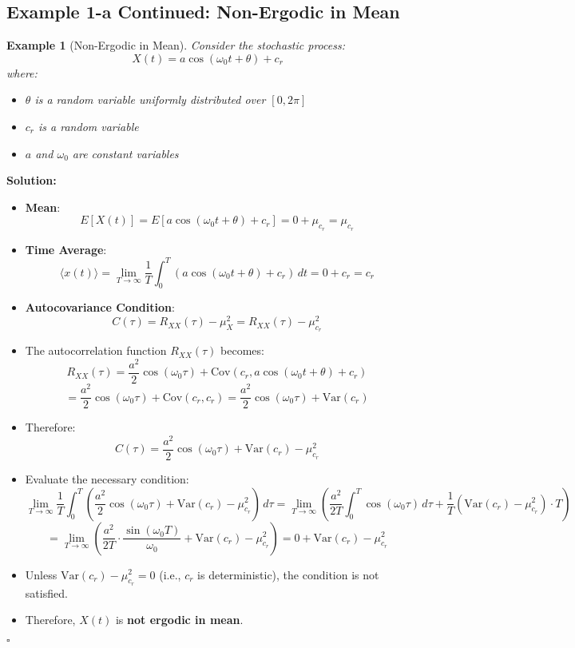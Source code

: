\documentclass[12pt]{article}
\newtheorem{example}{Example}
\newenvironment{solution}{\noindent\textbf{Solution:}}{\hfill$\square$}
\begin{document}
\subsection{Example 1-a Continued: Non-Ergodic in Mean}
\begin{example}[Non-Ergodic in Mean]
Consider the stochastic process:
\[
X(t) = a \cos(\omega_0 t + \theta) + c_r
\]
where:
\begin{itemize}
    \item \( \theta \) is a random variable uniformly distributed over \( [0, 2\pi] \)
    \item \( c_r \) is a random variable
    \item \( a \) and \( \omega_0 \) are constant variables
\end{itemize}
\end{example}
\begin{solution}
\begin{itemize}
    \item \textbf{Mean}:
    \[
    E[X(t)] = E[a \cos(\omega_0 t + \theta) + c_r] = 0 + \mu_{c_r} = \mu_{c_r}
    \]
    \item \textbf{Time Average}:
    \[
    \langle x(t) \rangle = \lim_{T \to \infty} \frac{1}{T} \int_{0}^{T} (a \cos(\omega_0 t + \theta) + c_r) \, dt = 0 + c_r = c_r
    \]
    \item \textbf{Autocovariance Condition}:
    \[
    C(\tau) = R_{XX}(\tau) - \mu_X^2 = R_{XX}(\tau) - \mu_{c_r}^2
    \]
    \item The autocorrelation function \( R_{XX}(\tau) \) becomes:
    \[
    R_{XX}(\tau) = \frac{a^2}{2} \cos(\omega_0 \tau) + \text{Cov}(c_r, a \cos(\omega_0 t + \theta) + c_r)
    \]
    \[
    = \frac{a^2}{2} \cos(\omega_0 \tau) + \text{Cov}(c_r, c_r) = \frac{a^2}{2} \cos(\omega_0 \tau) + \text{Var}(c_r)
    \]
    \item Therefore:
    \[
    C(\tau) = \frac{a^2}{2} \cos(\omega_0 \tau) + \text{Var}(c_r) - \mu_{c_r}^2
    \]
    \item Evaluate the necessary condition:
    \[
    \lim_{T \to \infty} \frac{1}{T} \int_{0}^{T} \left( \frac{a^2}{2} \cos(\omega_0 \tau) + \text{Var}(c_r) - \mu_{c_r}^2 \right) \, d\tau = \lim_{T \to \infty} \left( \frac{a^2}{2T} \int_{0}^{T} \cos(\omega_0 \tau) \, d\tau + \frac{1}{T} (\text{Var}(c_r) - \mu_{c_r}^2) \cdot T \right)
    \]
    \[
    = \lim_{T \to \infty} \left( \frac{a^2}{2T} \cdot \frac{\sin(\omega_0 T)}{\omega_0} + \text{Var}(c_r) - \mu_{c_r}^2 \right) = 0 + \text{Var}(c_r) - \mu_{c_r}^2
    \]
    \item Unless \( \text{Var}(c_r) - \mu_{c_r}^2 = 0 \) (i.e., \( c_r \) is deterministic), the condition is not satisfied.
    \item Therefore, \( X(t) \) is \textbf{not ergodic in mean}.
\end{itemize}
\end{solution}
\end{document}
